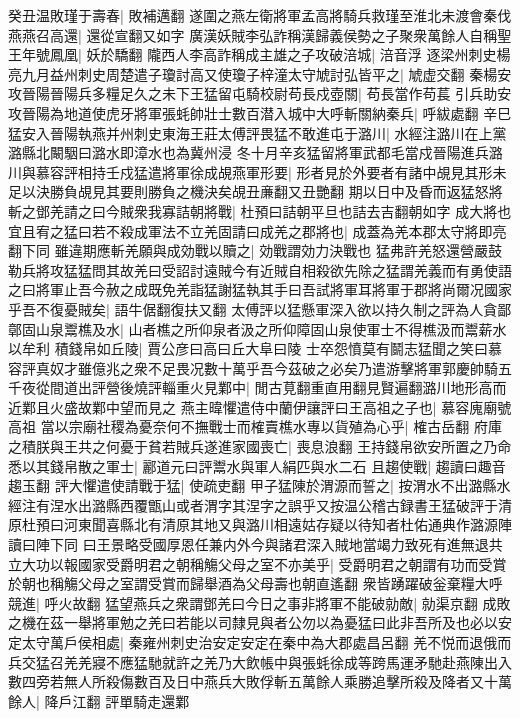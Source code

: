 癸丑温敗瑾于壽春|{
	敗補邁翻}
遂圍之燕左衛將軍孟高將騎兵救瑾至淮北未渡會秦伐燕燕召高還|{
	還從宣翻又如字}
廣漢妖賊李弘詐稱漢歸義侯勢之子聚衆萬餘人自稱聖王年號鳳凰|{
	妖於驕翻}
隴西人李高詐稱成主雄之子攻破涪城|{
	涪音浮}
逐梁州刺史楊亮九月益州刺史周楚遣子瓊討高又使瓊子梓潼太守虓討弘皆平之|{
	虓虚交翻}
秦楊安攻晉陽晉陽兵多糧足久之未下王猛留屯騎校尉苟長戍壺關|{
	苟長當作苟萇}
引兵助安攻晉陽為地道使虎牙將軍張蚝帥壯士數百潜入城中大呼斬關納秦兵|{
	呼紱處翻}
辛巳猛安入晉陽執燕并州刺史東海王莊太傅評畏猛不敢進屯于潞川|{
	水經注潞川在上黨潞縣北闞駰曰潞水即漳水也為冀州浸}
冬十月辛亥猛留將軍武都毛當戍晉陽進兵潞川與慕容評相持壬戍猛遣將軍徐成覘燕軍形要|{
	形者見於外要者有諸中覘見其形未足以決勝負覘見其要則勝負之機決矣覘丑亷翻又丑艷翻}
期以日中及昏而返猛怒將斬之鄧羌請之曰今賊衆我寡詰朝將戰|{
	杜預曰詰朝平旦也詰去吉翻朝如字}
成大將也宜且宥之猛曰若不殺成軍法不立羌固請曰成羌之郡將也|{
	成蓋為羌本郡太守將即亮翻下同}
雖違期應斬羌願與成効戰以贖之|{
	効戰謂効力決戰也}
猛弗許羌怒還營嚴鼓勒兵將攻猛猛問其故羌曰受詔討遠賊今有近賊自相殺欲先除之猛謂羌義而有勇使語之曰將軍止吾今赦之成既免羌詣猛謝猛執其手曰吾試將軍耳將軍于郡將尚爾况國家乎吾不復憂賊矣|{
	語牛倨翻復扶又翻}
太傅評以猛懸軍深入欲以持久制之評為人貪鄙鄣固山泉鬻樵及水|{
	山者樵之所仰泉者汲之所仰障固山泉使軍士不得樵汲而鬻薪水以牟利}
積錢帛如丘陵|{
	賈公彦曰高曰丘大阜曰陵}
士卒怨憤莫有鬬志猛聞之笑曰慕容評真奴才雖億兆之衆不足畏况數十萬乎吾今茲破之必矣乃遣游擊將軍郭慶帥騎五千夜從間道出評營後燒評輜重火見鄴中|{
	閒古莧翻重直用翻見賢遍翻潞川地形高而近鄴且火盛故鄴中望而見之}
燕主暐懼遣侍中蘭伊讓評曰王高祖之子也|{
	慕容廆廟號高祖}
當以宗廟社稷為憂奈何不撫戰士而榷賣樵水專以貨殖為心乎|{
	榷古岳翻}
府庫之積朕與王共之何憂于貧若賊兵遂進家國喪亡|{
	喪息浪翻}
王持錢帛欲安所置之乃命悉以其錢帛散之軍士|{
	酈道元曰評鬻水與軍人絹匹與水二石}
且趨使戰|{
	趨讀曰趣音趨玉翻}
評大懼遣使請戰于猛|{
	使疏吏翻}
甲子猛陳於渭源而誓之|{
	按渭水不出潞縣水經注有涅水出潞縣西覆甑山或者渭字其涅字之誤乎又按温公稽古録書王猛破評于清原杜預曰河東聞喜縣北有清原其地又與潞川相遠姑存疑以待知者杜佑通典作潞源陣讀曰陣下同}
曰王景略受國厚恩任兼内外今與諸君深入賊地當竭力致死有進無退共立大功以報國家受爵明君之朝稱觴父母之室不亦美乎|{
	受爵明君之朝謂有功而受賞於朝也稱觴父母之室謂受賞而歸舉酒為父母壽也朝直遙翻}
衆皆踴躍破釡棄糧大呼競進|{
	呼火故翻}
猛望燕兵之衆謂鄧羌曰今日之事非將軍不能破勍敵|{
	勍渠京翻}
成敗之機在茲一舉將軍勉之羌曰若能以司隸見與者公勿以為憂猛曰此非吾所及也必以安定太守萬戶侯相處|{
	秦雍州刺史治安定安定在秦中為大郡處昌呂翻}
羌不悦而退俄而兵交猛召羌羌寢不應猛馳就許之羌乃大飲帳中與張蚝徐成等跨馬運矛馳赴燕陳出入數四旁若無人所殺傷數百及日中燕兵大敗俘斬五萬餘人乘勝追擊所殺及降者又十萬餘人|{
	降戶江翻}
評單騎走還鄴

